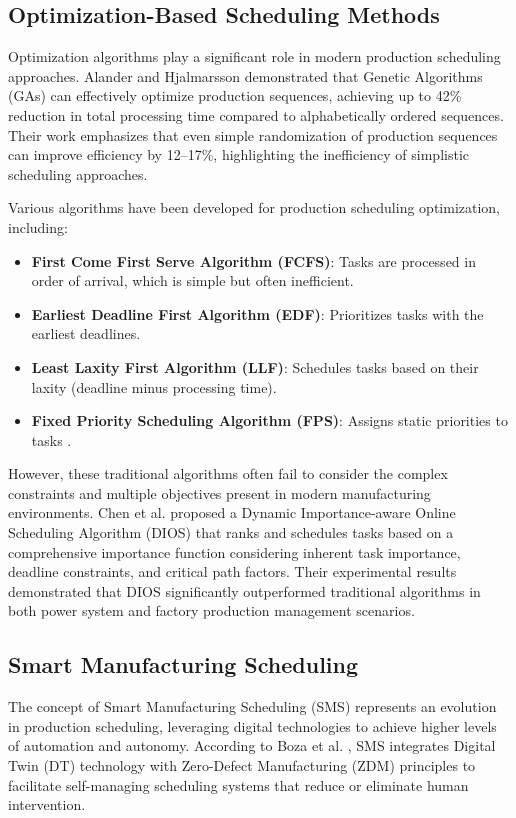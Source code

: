 \subsection{Optimization-Based Scheduling Methods}

Optimization algorithms play a significant role in modern production scheduling approaches. Alander and Hjalmarsson \cite{alander2024} demonstrated that Genetic Algorithms (GAs) can effectively optimize production sequences, achieving up to 42\% reduction in total processing time compared to alphabetically ordered sequences. Their work emphasizes that even simple randomization of production sequences can improve efficiency by 12--17\%, highlighting the inefficiency of simplistic scheduling approaches.

Various algorithms have been developed for production scheduling optimization, including:

\begin{itemize}
    \item \textbf{First Come First Serve Algorithm (FCFS)}: Tasks are processed in order of arrival, which is simple but often inefficient.
    \item \textbf{Earliest Deadline First Algorithm (EDF)}: Prioritizes tasks with the earliest deadlines.
    \item \textbf{Least Laxity First Algorithm (LLF)}: Schedules tasks based on their laxity (deadline minus processing time).
    \item \textbf{Fixed Priority Scheduling Algorithm (FPS)}: Assigns static priorities to tasks \cite{chen2023}.
\end{itemize}

However, these traditional algorithms often fail to consider the complex constraints and multiple objectives present in modern manufacturing environments. Chen et al. \cite{chen2023} proposed a Dynamic Importance-aware Online Scheduling Algorithm (DIOS) that ranks and schedules tasks based on a comprehensive importance function considering inherent task importance, deadline constraints, and critical path factors. Their experimental results demonstrated that DIOS significantly outperformed traditional algorithms in both power system and factory production management scenarios.

\subsection{Smart Manufacturing Scheduling}

The concept of Smart Manufacturing Scheduling (SMS) represents an evolution in production scheduling, leveraging digital technologies to achieve higher levels of automation and autonomy. According to Boza et al. \cite{serranoruiz2023}, SMS integrates Digital Twin (DT) technology with Zero-Defect Manufacturing (ZDM) principles to facilitate self-managing scheduling systems that reduce or eliminate human intervention.

